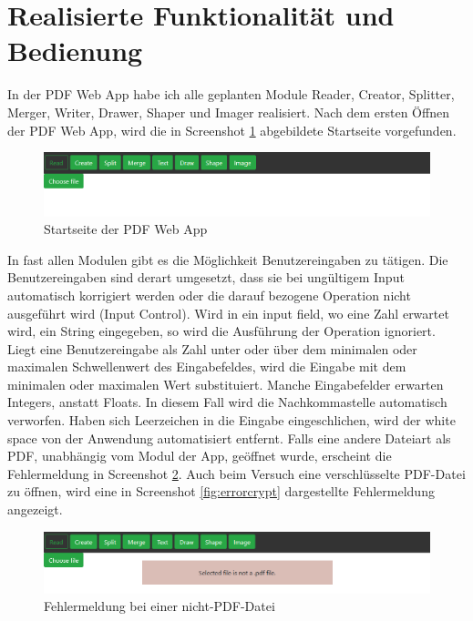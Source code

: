 \section{Realisierte Funktionalität und Bedienung}
In der PDF Web App habe ich alle geplanten Module Reader, Creator, Splitter, Merger, Writer, Drawer, Shaper und Imager realisiert. Nach dem ersten Öffnen der PDF Web App, wird die in Screenshot \ref{fig:start} abgebildete Startseite vorgefunden.

\begin{figure}[!htbp]
	\centering
	\includegraphics[width=1\textwidth]{"images/startseite.png"}
	\caption{Startseite der PDF Web App}
	\label{fig:start}
\end{figure}

In fast allen Modulen gibt es die Möglichkeit Benutzereingaben zu tätigen. Die Benutzereingaben sind derart umgesetzt, dass sie bei ungültigem Input automatisch korrigiert werden oder die darauf bezogene Operation nicht ausgeführt wird (Input Control). Wird in ein input field, wo eine Zahl erwartet wird, ein String eingegeben, so wird die Ausführung der Operation ignoriert. Liegt eine Benutzereingabe als Zahl unter oder über dem minimalen oder maximalen Schwellenwert des Eingabefeldes, wird die Eingabe mit dem minimalen oder maximalen Wert substituiert. Manche Eingabefelder erwarten Integers, anstatt Floats. In diesem Fall wird die Nachkommastelle automatisch verworfen. Haben sich Leerzeichen in die Eingabe eingeschlichen, wird der white space von der Anwendung automatisiert entfernt. Falls eine andere Dateiart als PDF, unabhängig vom Modul der App, geöffnet wurde, erscheint die Fehlermeldung in Screenshot \ref{fig:errorfile}. Auch beim Versuch eine verschlüsselte PDF-Datei zu öffnen, wird eine in Screenshot \ref{fig:errorcrypt} dargestellte Fehlermeldung angezeigt.

\begin{figure}[!htbp]
	\centering
	\includegraphics[width=1\textwidth]{"images/errorfile.png"}
	\caption{Fehlermeldung bei einer nicht-PDF-Datei}
	\label{fig:errorfile}
\end{figure}

